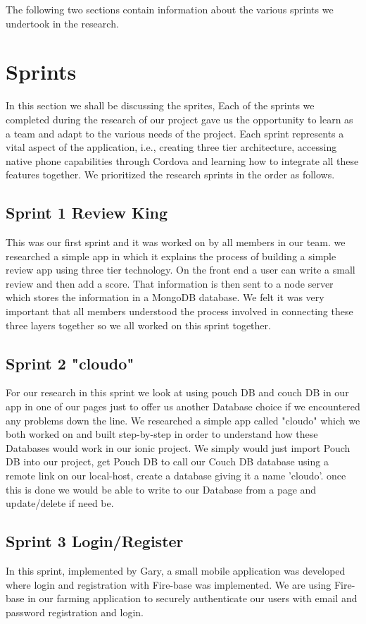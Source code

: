 \documentclass[12pt,a4paper,oneside,openany]{book}
\begin{document}
\noindent The following two sections contain information about the various sprints we undertook in the research. \\


\section{Sprints} \label{reseacrh_sprints}
In this section we shall be discussing the sprites, Each of the sprints we completed during the research of our project gave us the opportunity to learn as a team and adapt to the various needs of the project. Each sprint represents a vital aspect of the application, i.e., creating three tier architecture, accessing native phone capabilities through Cordova and learning how to integrate all these features together. We prioritized the research sprints in the order as follows.

\subsection{Sprint 1 Review King}
This was our first sprint and it was worked on by all members in our team. we researched a simple app in which it explains the process of building a simple review app using three tier technology. On the front end a user can write a small review and then add a score. That information is then sent to a node server which stores the information in a MongoDB database. We felt it was very important that all members understood the process involved in connecting these three layers together so we all worked on this sprint together.  \cite{Review} 

\subsection{Sprint 2 "cloudo"}
For our research in this sprint we look at using pouch DB and couch DB in our app in one of our pages just to offer us another Database choice if we encountered any problems down the line. We researched a simple app called "cloudo" which we both worked on and built step-by-step in order to understand how these Databases would work in our ionic project. We simply would just import Pouch DB into our project, get Pouch DB to call our Couch DB database using a remote link on our local-host, create a database giving it a name 'cloudo'. once this is done we would be able to write to our Database from a page and update/delete if need be.

\subsection{Sprint 3 Login/Register}
In this sprint, implemented by Gary, a small mobile application was developed where login and registration with Fire-base was implemented. We are using Fire-base in our farming application to securely authenticate our users with email and password registration and login. 
\end{document}
